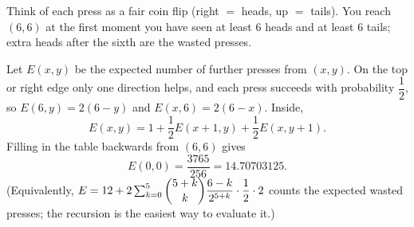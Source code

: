 Think of each press as a fair coin flip (right $=$ heads, up $=$ tails). You reach $(6,6)$ at the first moment you have seen at least $6$ heads and at least $6$ tails; extra heads after the sixth are the wasted presses.

Let $E(x,y)$ be the expected number of further presses from $(x,y)$. On the top or right edge only one direction helps, and each press succeeds with probability $\dfrac{1}{2}$, so $E(6,y)=2(6-y)$ and $E(x,6)=2(6-x)$. Inside,
\[E(x,y)=1+\dfrac{1}{2}E(x+1,y)+\dfrac{1}{2}E(x,y+1).\]
Filling in the table backwards from $(6,6)$ gives
\[E(0,0)=\dfrac{3765}{256}=\boxed{14.70703125}.\]
(Equivalently, $E=12+2\sum_{k=0}^{5}\dbinom{5+k}{k}\dfrac{6-k}{2^{5+k}}\cdot\dfrac{1}{2}\cdot2$ counts the expected wasted presses; the recursion is the easiest way to evaluate it.)

